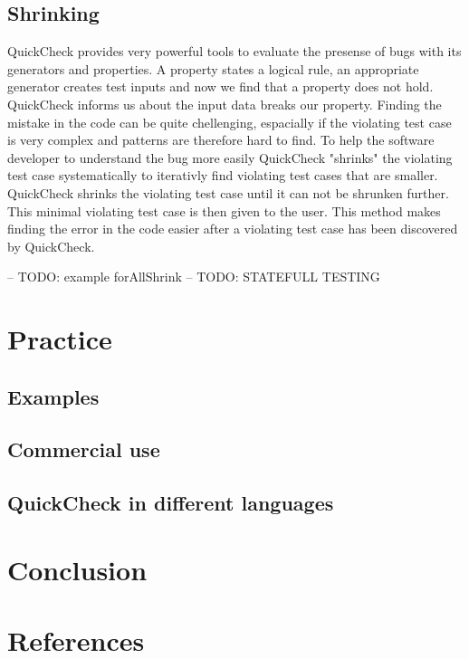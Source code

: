 \documentclass[a4paper, 12pt]{article} %
\begin{document}
\subsection{Shrinking}

QuickCheck provides very powerful tools to evaluate the presense of bugs with its generators and properties. A property states a logical rule, an appropriate generator creates test inputs and now we find that a property does not hold. QuickCheck informs us about the input data breaks our property. Finding the mistake in the code can be quite chellenging, espacially if the violating test case is very complex and patterns are therefore hard to find. To help the software developer to understand the bug more easily QuickCheck "shrinks" the violating test case systematically to iterativly find violating test cases that are smaller. QuickCheck shrinks the violating test case until it can not be shrunken further. This minimal violating test case is then given to the user. This method makes finding the error in the code easier after a violating test case has been discovered by QuickCheck. \cite{Claessen2009}

-- TODO: example forAllShrink
-- TODO: STATEFULL TESTING

\section{Practice}

\subsection{Examples}

\subsection{Commercial use}

\subsection{QuickCheck in different languages}

\section{Conclusion}

\newpage
\section{References}
\printbibliography[heading=none]
\end{document}
